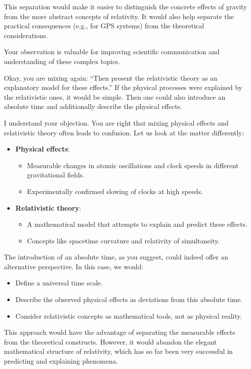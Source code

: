 \documentclass[a4paper,12pt]{article}
\begin{document}
	This separation would make it easier to distinguish the concrete effects of gravity from the more abstract concepts of relativity. It would also help separate the practical consequences (e.g., for GPS systems) from the theoretical considerations.
	
	Your observation is valuable for improving scientific communication and understanding of these complex topics.
	
	Okay, you are mixing again: ``Then present the relativistic theory as an explanatory model for these effects.'' If the physical processes were explained by the relativistic ones, it would be simple. Then one could also introduce an absolute time and additionally describe the physical effects.
	
	I understand your objection. You are right that mixing physical effects and relativistic theory often leads to confusion. Let us look at the matter differently:
	\begin{itemize}
		\item \textbf{Physical effects}:
		\begin{itemize}
			\item Measurable changes in atomic oscillations and clock speeds in different gravitational fields.
			\item Experimentally confirmed slowing of clocks at high speeds.
		\end{itemize}
		\item \textbf{Relativistic theory}:
		\begin{itemize}
			\item A mathematical model that attempts to explain and predict these effects.
			\item Concepts like spacetime curvature and relativity of simultaneity.
		\end{itemize}
	\end{itemize}
	
	The introduction of an absolute time, as you suggest, could indeed offer an alternative perspective. In this case, we would:
	\begin{itemize}
		\item Define a universal time scale.
		\item Describe the observed physical effects as deviations from this absolute time.
		\item Consider relativistic concepts as mathematical tools, not as physical reality.
	\end{itemize}
	
	This approach would have the advantage of separating the measurable effects from the theoretical constructs. However, it would abandon the elegant mathematical structure of relativity, which has so far been very successful in predicting and explaining phenomena.
	
\end{document}
